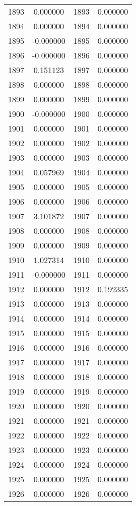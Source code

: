 \documentclass[12pt]{article}
\begin{document}
\begin{longtable}{@{}cccc@{}}
1893 & 0.000000 & 1893 & 0.000000 \\
1894 & 0.000000 & 1894 & 0.000000 \\
1895 & -0.000000 & 1895 & 0.000000 \\
1896 & -0.000000 & 1896 & 0.000000 \\
1897 & 0.151123 & 1897 & 0.000000 \\
1898 & 0.000000 & 1898 & 0.000000 \\
1899 & 0.000000 & 1899 & 0.000000 \\
1900 & -0.000000 & 1900 & 0.000000 \\
1901 & 0.000000 & 1901 & 0.000000 \\
1902 & 0.000000 & 1902 & 0.000000 \\
1903 & 0.000000 & 1903 & 0.000000 \\
1904 & 0.057969 & 1904 & 0.000000 \\
1905 & 0.000000 & 1905 & 0.000000 \\
1906 & 0.000000 & 1906 & 0.000000 \\
1907 & 3.101872 & 1907 & 0.000000 \\
1908 & 0.000000 & 1908 & 0.000000 \\
1909 & 0.000000 & 1909 & 0.000000 \\
1910 & 1.027314 & 1910 & 0.000000 \\
1911 & -0.000000 & 1911 & 0.000000 \\
1912 & 0.000000 & 1912 & 0.192335 \\
1913 & 0.000000 & 1913 & 0.000000 \\
1914 & 0.000000 & 1914 & 0.000000 \\
1915 & 0.000000 & 1915 & 0.000000 \\
1916 & 0.000000 & 1916 & 0.000000 \\
1917 & 0.000000 & 1917 & 0.000000 \\
1918 & 0.000000 & 1918 & 0.000000 \\
1919 & 0.000000 & 1919 & 0.000000 \\
1920 & 0.000000 & 1920 & 0.000000 \\
1921 & 0.000000 & 1921 & 0.000000 \\
1922 & 0.000000 & 1922 & 0.000000 \\
1923 & 0.000000 & 1923 & 0.000000 \\
1924 & 0.000000 & 1924 & 0.000000 \\
1925 & 0.000000 & 1925 & 0.000000 \\
1926 & 0.000000 & 1926 & 0.000000 \\

\end{longtable}
\end{document}
